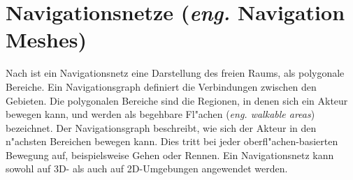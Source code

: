 \section{Navigationsnetze (\textit{eng.} Navigation Meshes)}
%
Nach \cite{Mesh:16} ist ein Navigationsnetz eine Darstellung des freien Raums, als polygonale Bereiche. Ein Navigationsgraph definiert die Verbindungen zwischen den Gebieten. Die polygonalen Bereiche sind die Regionen, in denen sich ein Akteur bewegen kann, und werden als begehbare Fl"achen (\textit{eng. walkable areas}) bezeichnet. Der Navigationsgraph beschreibt, wie sich der Akteur in den n"achsten Bereichen bewegen kann. Dies tritt bei jeder oberfl"achen-basierten Bewegung auf, beispielsweise Gehen oder Rennen. Ein Navigationsnetz kann sowohl auf 3D- als auch auf 2D-Umgebungen angewendet werden.


